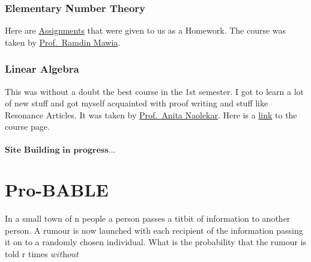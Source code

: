 \documentclass[
  letterpaper,
  DIV=11,
  numbers=noendperiod]{scrreprt}
\begin{document}
\begin{tcolorbox}
\subsection{Elementary Number Theory}\label{elementary-number-theory}

Here are
\href{https://drive.google.com/file/d/1a-w8kH7kZud-1WypK9IrwDW7UoYUFmZf/view?usp=sharing}{Assignments}
that were given to us as a Homework. The course was taken by
\href{https://sites.google.com/view/ramdinmawia/home}{Prof.~Ramdin
Mawia}.

\subsection{Linear Algebra}\label{linear-algebra}

This was without a doubt the best course in the 1st semester. I got to
learn a lot of new stuff and got myself acquainted with proof writing
and stuff like Resonance Articles. It was taken by
\href{https://www.isibang.ac.in/~statmath/homepage.html}{Prof.~Anita
Naolekar}. Here is a
\href{https://www.isibang.ac.in/~adean/infsys/database/Bmath/LAlg1.html}{link}
to the course page.

\subsection{}\label{section}

\(\textbf{Site Building in progress...}\)


\chapter{Pro-BABLE}\label{pro-bable}

\begin{tcolorbox}[enhanced jigsaw, colframe=quarto-callout-note-color-frame, coltitle=black, bottomtitle=1mm, toprule=.15mm, breakable, title=\textcolor{quarto-callout-note-color}{\faInfo}\hspace{0.5em}{Spread of Rumours}, rightrule=.15mm, titlerule=0mm, toptitle=1mm, opacityback=0, arc=.35mm, left=2mm, bottomrule=.15mm, leftrule=.75mm, opacitybacktitle=0.6, colback=white, colbacktitle=quarto-callout-note-color!10!white]

In a small town of n people a person passes a titbit of information to
another person. A rumour is now launched with each recipient of the
information passing it on to a randomly chosen individual. What is the
probability that the rumour is told r times \(\textit{without}\)


\end{tcolorbox}
\end{tcolorbox}
\end{document}
